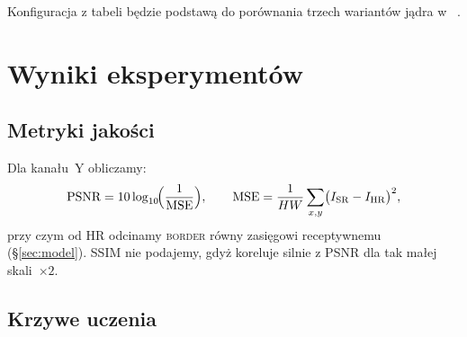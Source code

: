 \documentclass[11pt]{article}
\begin{document}
\bigskip
Konfiguracja z tabeli
 będzie podstawą do porównania
trzech wariantów jądra w~
.

\section{Wyniki eksperymentów}
\label{sec:results}

\subsection{Metryki jakości}

Dla kanału~Y obliczamy:
\[
  \text{PSNR} = 10 \log_{10}\!
  \Bigl(\frac{1}{\text{MSE}}\Bigr),\qquad
  \text{MSE}=\frac1{HW}\sum_{x,y}
  \bigl(I_\mathrm{SR}-I_\mathrm{HR}\bigr)^{2},
\]
przy czym od HR odcinamy \textsc{border} równy zasięgowi receptywnemu
(\S\ref{sec:model}).  SSIM nie podajemy, gdyż koreluje silnie z PSNR
dla tak małej skali~$\times2$.

\subsection{Krzywe uczenia}
\end{document}
